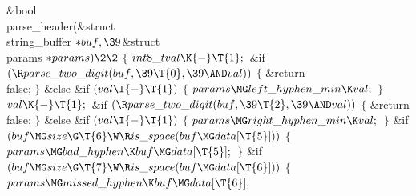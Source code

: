 \Y\B\1\1\&{bool} \\{parse\_header}(\&{struct} \\{string\_buffer} ${}{*}\\{buf},%
\39{}$\&{struct} \\{params} ${}{*}\\{params})\2\2{}$\6
${}\{{}$\1\6
${}\\{int8\_t}\\{val}\K{-}\T{1};{}$\6
\&{if} ${}(\R\\{parse\_two\_digit}(\\{buf},\39\T{0},\39{\AND}\\{val})){}$\5
${}\{{}$\1\6
\&{return} \\{false};\6
\4${}\}{}$\2\6
\&{else} \&{if} ${}(\\{val}\I{-}\T{1}){}$\5
${}\{{}$\1\6
${}\\{params}\MG\\{left\_hyphen\_min}\K\\{val};{}$\6
\4${}\}{}$\2\6
${}\\{val}\K{-}\T{1};{}$\6
\&{if} ${}(\R\\{parse\_two\_digit}(\\{buf},\39\T{2},\39{\AND}\\{val})){}$\5
${}\{{}$\1\6
\&{return} \\{false};\6
\4${}\}{}$\2\6
\&{else} \&{if} ${}(\\{val}\I{-}\T{1}){}$\5
${}\{{}$\1\6
${}\\{params}\MG\\{right\_hyphen\_min}\K\\{val};{}$\6
\4${}\}{}$\2\6
\&{if} ${}(\\{buf}\MG\\{size}\G\T{6}\W\R\\{is\_space}(\\{buf}\MG\\{data}[%
\T{5}])){}$\5
${}\{{}$\1\6
${}\\{params}\MG\\{bad\_hyphen}\K\\{buf}\MG\\{data}[\T{5}];{}$\6
\4${}\}{}$\2\6
\&{if} ${}(\\{buf}\MG\\{size}\G\T{7}\W\R\\{is\_space}(\\{buf}\MG\\{data}[%
\T{6}])){}$\5
${}\{{}$\1\6
${}\\{params}\MG\\{missed\_hyphen}\K\\{buf}\MG\\{data}[\T{6}];{}$\6
